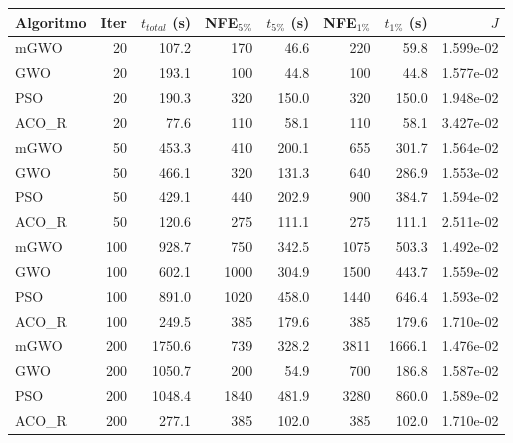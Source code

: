 \begin{tabular}{lrrrrrrr}
\hline
Algoritmo & Iter & $t_{total}$ (s) & NFE$_{5\%}$ & $t_{5\%}$ (s) & NFE$_{1\%}$ & $t_{1\%}$ (s) & $J$ \\
\hline
mGWO & 20 & 107.2 & 170 & 46.6 & 220 & 59.8 & 1.599e-02 \\
GWO & 20 & 193.1 & 100 & 44.8 & 100 & 44.8 & 1.577e-02 \\
PSO & 20 & 190.3 & 320 & 150.0 & 320 & 150.0 & 1.948e-02 \\
ACO\_R & 20 & 77.6 & 110 & 58.1 & 110 & 58.1 & 3.427e-02 \\
mGWO & 50 & 453.3 & 410 & 200.1 & 655 & 301.7 & 1.564e-02 \\
GWO & 50 & 466.1 & 320 & 131.3 & 640 & 286.9 & 1.553e-02 \\
PSO & 50 & 429.1 & 440 & 202.9 & 900 & 384.7 & 1.594e-02 \\
ACO\_R & 50 & 120.6 & 275 & 111.1 & 275 & 111.1 & 2.511e-02 \\
mGWO & 100 & 928.7 & 750 & 342.5 & 1075 & 503.3 & 1.492e-02 \\
GWO & 100 & 602.1 & 1000 & 304.9 & 1500 & 443.7 & 1.559e-02 \\
PSO & 100 & 891.0 & 1020 & 458.0 & 1440 & 646.4 & 1.593e-02 \\
ACO\_R & 100 & 249.5 & 385 & 179.6 & 385 & 179.6 & 1.710e-02 \\
mGWO & 200 & 1750.6 & 739 & 328.2 & 3811 & 1666.1 & 1.476e-02 \\
GWO & 200 & 1050.7 & 200 & 54.9 & 700 & 186.8 & 1.587e-02 \\
PSO & 200 & 1048.4 & 1840 & 481.9 & 3280 & 860.0 & 1.589e-02 \\
ACO\_R & 200 & 277.1 & 385 & 102.0 & 385 & 102.0 & 1.710e-02 \\
\hline
\end{tabular}
